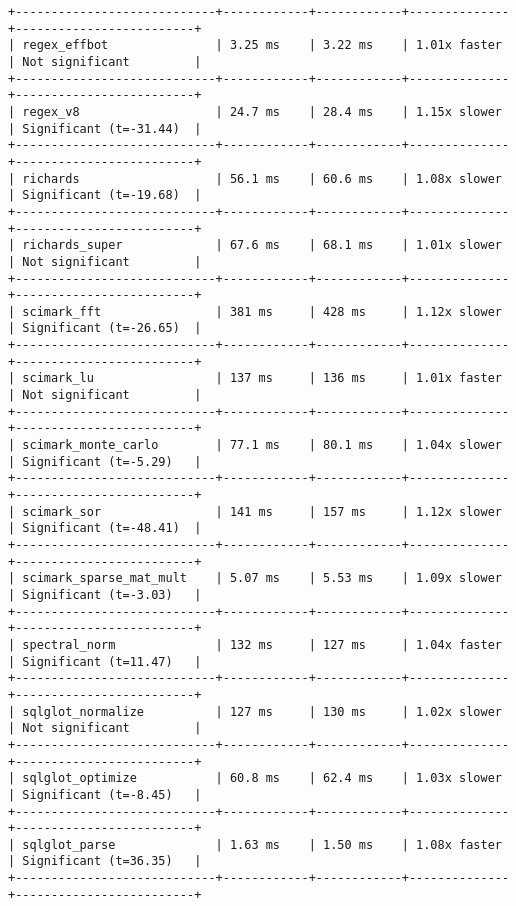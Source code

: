 \begin{code}
\begin{verbatim}
+----------------------------+------------+------------+--------------+-------------------------+
| regex_effbot               | 3.25 ms    | 3.22 ms    | 1.01x faster | Not significant         |
+----------------------------+------------+------------+--------------+-------------------------+
| regex_v8                   | 24.7 ms    | 28.4 ms    | 1.15x slower | Significant (t=-31.44)  |
+----------------------------+------------+------------+--------------+-------------------------+
| richards                   | 56.1 ms    | 60.6 ms    | 1.08x slower | Significant (t=-19.68)  |
+----------------------------+------------+------------+--------------+-------------------------+
| richards_super             | 67.6 ms    | 68.1 ms    | 1.01x slower | Not significant         |
+----------------------------+------------+------------+--------------+-------------------------+
| scimark_fft                | 381 ms     | 428 ms     | 1.12x slower | Significant (t=-26.65)  |
+----------------------------+------------+------------+--------------+-------------------------+
| scimark_lu                 | 137 ms     | 136 ms     | 1.01x faster | Not significant         |
+----------------------------+------------+------------+--------------+-------------------------+
| scimark_monte_carlo        | 77.1 ms    | 80.1 ms    | 1.04x slower | Significant (t=-5.29)   |
+----------------------------+------------+------------+--------------+-------------------------+
| scimark_sor                | 141 ms     | 157 ms     | 1.12x slower | Significant (t=-48.41)  |
+----------------------------+------------+------------+--------------+-------------------------+
| scimark_sparse_mat_mult    | 5.07 ms    | 5.53 ms    | 1.09x slower | Significant (t=-3.03)   |
+----------------------------+------------+------------+--------------+-------------------------+
| spectral_norm              | 132 ms     | 127 ms     | 1.04x faster | Significant (t=11.47)   |
+----------------------------+------------+------------+--------------+-------------------------+
| sqlglot_normalize          | 127 ms     | 130 ms     | 1.02x slower | Not significant         |
+----------------------------+------------+------------+--------------+-------------------------+
| sqlglot_optimize           | 60.8 ms    | 62.4 ms    | 1.03x slower | Significant (t=-8.45)   |
+----------------------------+------------+------------+--------------+-------------------------+
| sqlglot_parse              | 1.63 ms    | 1.50 ms    | 1.08x faster | Significant (t=36.35)   |
+----------------------------+------------+------------+--------------+-------------------------+

\end{verbatim}
\end{code}
